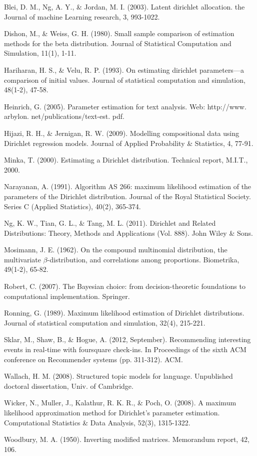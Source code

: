 \documentclass[twoside]{article}
\begin{document}
\begin{thebibliography}{20}

Blei, D. M., Ng, A. Y., \& Jordan, M. I. (2003). Latent dirichlet allocation. the Journal of machine Learning research, 3, 993-1022.

Dishon, M., \& Weiss, G. H. (1980). Small sample comparison of estimation methods for the beta distribution. Journal of Statistical Computation and Simulation, 11(1), 1-11.

Hariharan, H. S., \& Velu, R. P. (1993). On estimating dirichlet parameters—a comparison of initial values. Journal of statistical computation and simulation, 48(1-2), 47-58.

Heinrich, G. (2005). Parameter estimation for text analysis. Web: http://www. arbylon. net/publications/text-est. pdf.

Hijazi, R. H., \& Jernigan, R. W. (2009). Modelling compositional data using Dirichlet regression models. Journal of Applied Probability \& Statistics, 4, 77-91.

Minka, T. (2000). Estimating a Dirichlet distribution. Technical report, M.I.T., 2000.

Narayanan, A. (1991). Algorithm AS 266: maximum likelihood estimation of the parameters of the Dirichlet distribution. Journal of the Royal Statistical Society. Series C (Applied Statistics), 40(2), 365-374.

Ng, K. W., Tian, G. L., \& Tang, M. L. (2011). Dirichlet and Related Distributions: Theory, Methods and Applications (Vol. 888). John Wiley \& Sons.

Mosimann, J. E. (1962). On the compound multinomial distribution, the multivariate \(\beta\)-distribution, and correlations among proportions. Biometrika, 49(1-2), 65-82.

Robert, C. (2007). The Bayesian choice: from decision-theoretic foundations to computational implementation. Springer.

Ronning, G. (1989). Maximum likelihood estimation of Dirichlet distributions. Journal of statistical computation and simulation, 32(4), 215-221.

Sklar, M., Shaw, B., \& Hogue, A. (2012, September). Recommending interesting events in real-time with foursquare check-ins. In Proceedings of the sixth ACM conference on Recommender systems (pp. 311-312). ACM.

Wallach, H. M. (2008). Structured topic models for language. Unpublished doctoral dissertation, Univ. of Cambridge.

Wicker, N., Muller, J., Kalathur, R. K. R., \& Poch, O. (2008). A maximum likelihood approximation method for Dirichlet's parameter estimation. Computational Statistics \& Data Analysis, 52(3), 1315-1322.

Woodbury, M. A. (1950). Inverting modified matrices. Memorandum report, 42, 106.

\end{thebibliography}
\end{document}
